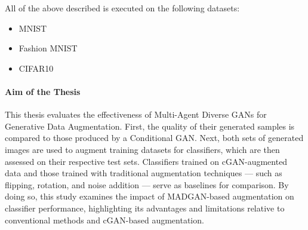\noindent All of the above described is executed on the following datasets:
\begin{itemize}\label{used_datasets}
    \setlength{\itemsep}{-5pt}
    \item MNIST \cite{lecun2010mnist}
    \item Fashion MNIST \cite{xiao2017fashionmnist}
    \item CIFAR10 \cite{Krizhevsky2009learning}
\end{itemize}


\paragraph{Aim of the Thesis}\label{aim_of_the_thesis}
This thesis evaluates the effectiveness of Multi-Agent Diverse GANs for Generative Data Augmentation. First, the quality of their generated samples is compared to those produced by a Conditional GAN. Next, both sets of generated images are used to augment training datasets for classifiers, which are then assessed on their respective test sets. Classifiers trained on cGAN-augmented data and those trained with traditional augmentation techniques — such as flipping, rotation, and noise addition — serve as baselines for comparison.
By doing so, this study examines the impact of MADGAN-based augmentation on classifier performance, highlighting its advantages and limitations relative to conventional methods and cGAN-based augmentation.



\newpage
